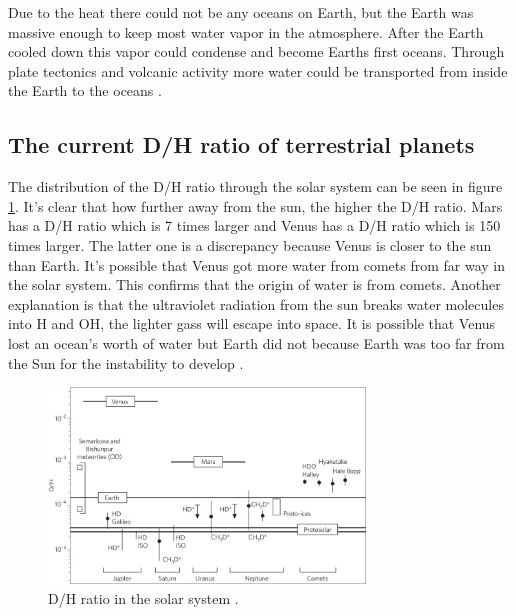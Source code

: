 Due to the heat there could not be any oceans on Earth, but the Earth was massive enough to keep most water vapor in the atmosphere. After the Earth cooled down this vapor could condense and become Earths first oceans. Through plate tectonics and volcanic activity more water could be transported from inside the Earth to the oceans \cite[p.~130-131]{TPmagma}.


\newpage
\subsection{The current D/H ratio of terrestrial planets}
The distribution of the D/H ratio through the solar system can be seen in figure \ref{fig:dh-ratio-terrestrial-planets}. It's clear that how further away from the sun, the higher the D/H ratio. Mars has a D/H ratio which is 7 times larger and Venus has a D/H ratio which is 150 times larger. The latter one is a discrepancy because Venus is closer to the sun than Earth. It's possible that Venus got more water from comets from far way in the solar system. This confirms that the origin of water is from comets. Another explanation is that the ultraviolet radiation from the sun breaks water molecules into H and OH, the lighter gass will escape into space. It is possible that Venus lost an ocean’s worth of water but Earth did not because Earth was too far from the Sun for the instability to develop \cite{TPthreeEras}.

\begin{figure}[H]
	\center
	\includegraphics[width=0.75\textwidth]{figures/dh-ratio-terrestrial-planets.jpg}
	\caption{\label{fig:dh-ratio-terrestrial-planets}D/H ratio in the solar system \cite{TPthreeEras}.}
\end{figure}
